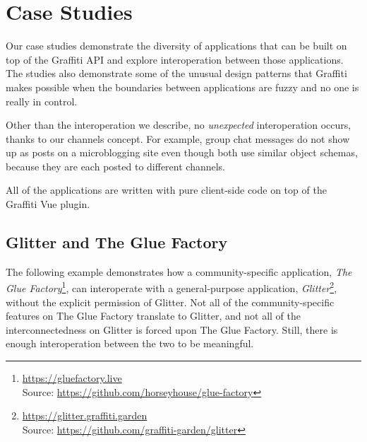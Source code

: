 \section{Case Studies}
\label{case-studies}


Our case studies demonstrate the diversity of applications
that can be built on top of the Graffiti API and explore interoperation
between those applications.
The studies also demonstrate some of the unusual design patterns that
Graffiti makes possible when the boundaries between applications
are fuzzy and no one is really in control.

Other than the interoperation we describe, no \emph{unexpected}
interoperation occurs, thanks to our channels concept.
For example, group chat messages do not show up as posts on
a microblogging site even though both use similar object schemas,
because they are each posted to different channels.

All of the applications are written with pure client-side code on
top of the Graffiti Vue plugin.

\subsection{Glitter and The Glue Factory}

The following example demonstrates how a community-specific application,
\emph{The Glue Factory}\footnote{
\url{https://gluefactory.live}\\Source: \url{https://github.com/horseyhouse/glue-factory}
}, can interoperate with a general-purpose application, \emph{Glitter}\footnote{
\url{https://glitter.graffiti.garden}\\Source: \url{https://github.com/graffiti-garden/glitter}
},
without the explicit permission of Glitter.
Not all of the community-specific features on The Glue Factory
translate to Glitter, and not all of the interconnectedness on Glitter
is forced upon The Glue Factory.
Still, there is enough interoperation between the two to be meaningful.

